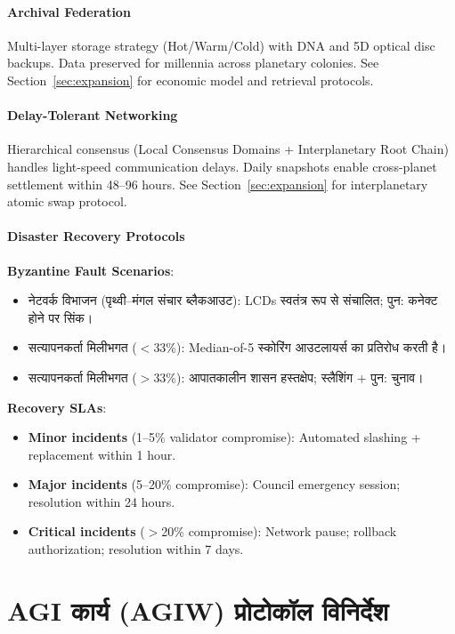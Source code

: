 \documentclass[11pt]{article}
\begin{document}
\begin{itemize}[noitemsep]
\begin{itemize}[noitemsep]
\paragraph{Archival Federation}
Multi-layer storage strategy (Hot/Warm/Cold) with DNA and 5D optical disc backups. Data preserved for millennia across planetary colonies. See Section~\ref{sec:expansion} for economic model and retrieval protocols.

\paragraph{Delay-Tolerant Networking}
Hierarchical consensus (Local Consensus Domains + Interplanetary Root Chain) handles light-speed communication delays. Daily snapshots enable cross-planet settlement within 48--96 hours. See Section~\ref{sec:expansion} for interplanetary atomic swap protocol.

\paragraph{Disaster Recovery Protocols}
\textbf{Byzantine Fault Scenarios}:
\begin{itemize}[noitemsep]
  \item नेटवर्क विभाजन (पृथ्वी--मंगल संचार ब्लैकआउट): LCDs स्वतंत्र रूप से संचालित; पुन: कनेक्ट होने पर सिंक।
  \item सत्यापनकर्ता मिलीभगत ($<$33\%): Median-of-5 स्कोरिंग आउटलायर्स का प्रतिरोध करती है।
  \item सत्यापनकर्ता मिलीभगत ($>$33\%): आपातकालीन शासन हस्तक्षेप; स्लैशिंग + पुन: चुनाव।
\end{itemize}

\textbf{Recovery SLAs}:
\begin{itemize}[noitemsep]
  \item \textbf{Minor incidents} (1--5\% validator compromise): Automated slashing + replacement within 1 hour.
  \item \textbf{Major incidents} (5--20\% compromise): Council emergency session; resolution within 24 hours.
  \item \textbf{Critical incidents} ($>$20\% compromise): Network pause; rollback authorization; resolution within 7 days.
\end{itemize}

\section{AGI कार्य (AGIW) प्रोटोकॉल विनिर्देश}
\label{sec:agiw-spec}


\end{itemize}
\end{itemize}
\end{document}
